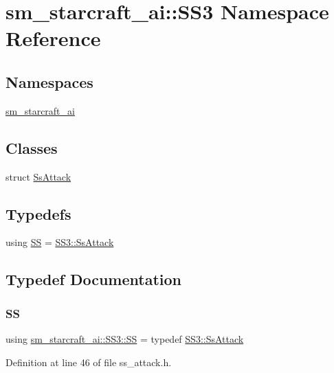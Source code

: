 \hypertarget{namespacesm__starcraft__ai_1_1SS3}{}\section{sm\+\_\+starcraft\+\_\+ai\+:\+:S\+S3 Namespace Reference}
\label{namespacesm__starcraft__ai_1_1SS3}
\subsection*{Namespaces}
\begin{DoxyCompactItemize}
\item 
 \hyperlink{namespacesm__starcraft__ai_1_1SS3_1_1sm__starcraft__ai}{sm\+\_\+starcraft\+\_\+ai}
\end{DoxyCompactItemize}
\subsection*{Classes}
\begin{DoxyCompactItemize}
\item 
struct \hyperlink{structsm__starcraft__ai_1_1SS3_1_1SsAttack}{Ss\+Attack}
\end{DoxyCompactItemize}
\subsection*{Typedefs}
\begin{DoxyCompactItemize}
\item 
using \hyperlink{namespacesm__starcraft__ai_1_1SS3_a0614e8e9c4f66c30ae846ab556b4dd1e}{SS} = \hyperlink{structsm__starcraft__ai_1_1SS3_1_1SsAttack}{S\+S3\+::\+Ss\+Attack}
\end{DoxyCompactItemize}


\subsection{Typedef Documentation}
\mbox{\label{namespacesm__starcraft__ai_1_1SS3_a0614e8e9c4f66c30ae846ab556b4dd1e}} 
\subsubsection{\texorpdfstring{SS}{SS}}
{\footnotesize\ttfamily using \hyperlink{namespacesm__starcraft__ai_1_1SS3_a0614e8e9c4f66c30ae846ab556b4dd1e}{sm\+\_\+starcraft\+\_\+ai\+::\+S\+S3\+::\+SS} = typedef \hyperlink{structsm__starcraft__ai_1_1SS3_1_1SsAttack}{S\+S3\+::\+Ss\+Attack}}



Definition at line 46 of file ss\+\_\+attack.\+h.

